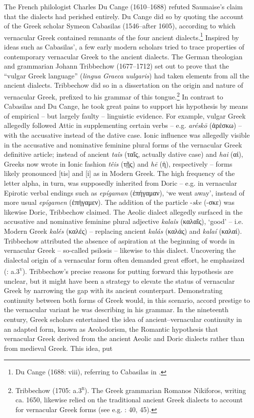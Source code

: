 The French philologist Charles Du Cange (1610–1688) refuted Saumaise’s claim that the dialects had perished entirely. Du Cange did so by quoting the account of the Greek scholar Symeon Cabasilas (1546–after 1605), according to which vernacular Greek contained remnants of the four ancient dialects.\footnote{Du Cange (1688: viii), referring to Cabasilas in \citet[462]{Crusius1584}.} Inspired by ideas such as Cabasilas’, a few early modern scholars tried to trace properties of contemporary vernacular Greek to the ancient dialects. The German theologian and grammarian Johann Tribbechow (1677–1712) set out to prove that the “vulgar Greek language” (\textit{lingua} \textit{Graeca} \textit{uulgaris}) had taken elements from all the ancient dialects. Tribbechow did so in a dissertation on the origin and nature of vernacular Greek, prefixed to his grammar of this tongue.\footnote{Tribbechow (1705: a.3\textsc{\textsuperscript{r}}). The Greek grammarian Romanos Nikiforos, writing ca. 1650, likewise relied on the traditional ancient Greek dialects to account for vernacular Greek forms (see e.g. \citealt{Nikiforos1908}: 40, 45).} In contrast to Cabasilas and Du Cange, he took great pains to support his hypothesis by means of empirical – but largely faulty – linguistic evidence. For example, vulgar Greek allegedly followed Attic in supplementing certain verbs – e.g. \textit{aréskō} (ἀρέσκω) – with the accusative instead of the dative case. Ionic influence was allegedly visible in the accusative and nominative feminine plural forms of the vernacular Greek definitive article; instead of ancient \textit{taîs} (ταῖς, actually dative case) and \textit{hai} (αἱ), Greeks now wrote in Ionic fashion \textit{têis} (τῇς) and \textit{hē} (ἡ), respectively – forms likely pronounced [tis] and [i] as in Modern Greek. The high frequency of the letter alpha, in turn, was supposedly inherited from Doric – e.g. in vernacular Epirotic verbal endings such as \textit{epígaman} (ἐπήγαμαν), ‘we went away’, instead of more usual \textit{epígamen} (ἐπήγαμεν). The addition of the particle -\textit{ske} (-σκε) was likewise Doric, Tribbechow claimed. The Aeolic dialect allegedly surfaced in the accusative and nominative feminine plural adjective \textit{kalaîs} (καλαῖς), ‘good’ – i.e. Modern Greek \textit{kalés} (καλές) – replacing ancient \textit{kalás} (καλάς) and \textit{kalaí} (καλαί). Tribbechow attributed the absence of aspiration at the beginning of words in vernacular Greek – so-called psilosis – likewise to this dialect. Uncovering the dialectal origin of a vernacular form often demanded great effort, he emphasized (\citealt{Tribbechow1705}: a.3\textsc{\textsuperscript{v}}). Tribbechow’s precise reasons for putting forward this hypothesis are unclear, but it might have been a strategy to elevate the status of vernacular Greek by narrowing the gap with its ancient counterpart. Demonstrating continuity between both forms of Greek would, in this scenario, accord prestige to the vernacular variant he was describing in his grammar. In the nineteenth century, Greek scholars entertained the idea of ancient–vernacular continuity in an adapted form, known as Aeolodorism, the Romantic hypothesis that vernacular Greek derived from the ancient Aeolic and Doric dialects rather than from medieval Greek. This idea, put 